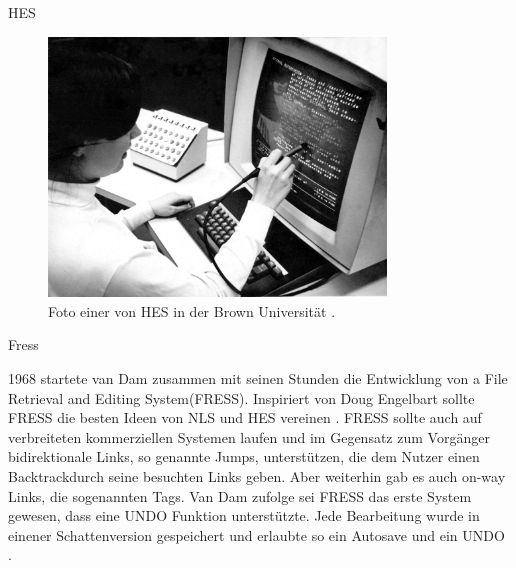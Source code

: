\begin{section}{HES}
\begin{figure}[!ht]
	\centering
	\includegraphics[width=0.8\textwidth]{image/hes}
	\caption{Foto einer von HES in der Brown Universität \cite{Lloyd1969}.}
	\label{fig:hes}
\end{figure}

\end{section}

\begin{section}{Fress}
\label{sec:fress}
	
1968 startete van Dam zusammen mit seinen Stunden die Entwicklung von \glqq a File Retrieval and Editing System\grqq{ }(FRESS). Inspiriert von Doug Engelbart sollte FRESS die besten Ideen von NLS und HES vereinen \cite[S.887 und 890]{Dam1988}. FRESS sollte auch auf verbreiteten kommerziellen Systemen laufen und im Gegensatz zum Vorgänger bidirektionale Links, so genannte \glqq Jumps\grqq{ }, unterstützen, die dem Nutzer einen \glqq Backtrack\grqq{ }durch seine besuchten Links geben. Aber weiterhin gab es auch on-way Links, die sogenannten \glqq Tags\grqq{ }. Van Dam zufolge sei FRESS das erste System gewesen, dass eine UNDO Funktion unterstützte. Jede Bearbeitung wurde in einener Schattenversion gespeichert und erlaubte so ein Autosave und ein UNDO \cite[S.891]{Dam1988}.

\end{section}

